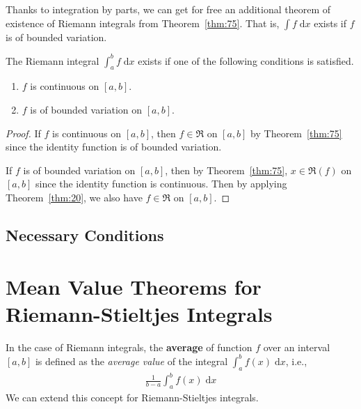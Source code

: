 \documentclass[thmcnt=section, 12pt]{my-elegantbook}
\begin{document}

Thanks to integration by parts,
we can get for free
an additional theorem of existence
of Riemann integrals from Theorem~\ref{thm:75}.
That is, $ \int f \; \mathrm{d} x $ exists
if $ f $ is of bounded variation.

\begin{theorem} \label{thm:76}
    The Riemann integral $ \int_a^b f \; \mathrm{d} x $
    exists if one of the following conditions is satisfied.
    \begin{enumerate}
        \item $ f $ is continuous on $ [a, b] $.
        \item $ f $ is of bounded variation on $ [a, b] $.
    \end{enumerate}
\end{theorem}

\begin{proof}
    If $ f $ is continuous on $ [a, b] $, then
    $ f \in \mathfrak{R} $ on $ [a, b] $ by Theorem~\ref{thm:75}
    since the identity function is of bounded variation.

    If $ f $ is of bounded variation on $ [a, b] $,
    then by Theorem~\ref{thm:75},
    $ x \in \mathfrak{R}(f) $ on $ [a, b] $
    since the identity function is continuous.
    Then by applying Theorem~\ref{thm:20},
    we also have $ f \in \mathfrak{R} $ on $ [a, b] $.
\end{proof}


\subsection{Necessary Conditions}


\section{Mean Value Theorems for Riemann-Stieltjes Integrals}


In the case of Riemann integrals,
the \textbf{average}
of function $f$ over an interval $[a, b]$ is defined as
the \textit{average value} of the integral
$\int_a^b f(x) \; \mathrm{d} x$, i.e.,
\begin{align*}
    \frac{1}{b - a} \int_a^b f(x) \; \mathrm{d} x
\end{align*}
We can extend this concept for Riemann-Stieltjes integrals.
\end{document}
